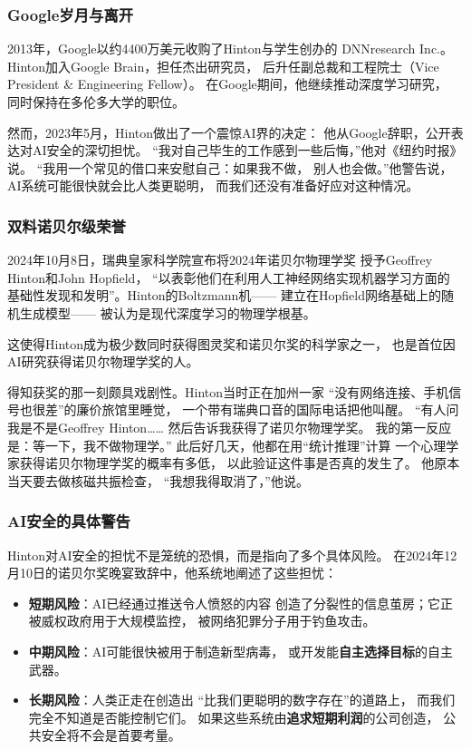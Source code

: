 \subsubsection{Google岁月与离开}
2013年，Google以约4400万美元收购了Hinton与学生创办的
DNNresearch Inc.。Hinton加入Google Brain，担任杰出研究员，
后升任副总裁和工程院士（Vice President \& Engineering Fellow）。
在Google期间，他继续推动深度学习研究，
同时保持在多伦多大学的职位。

然而，2023年5月，Hinton做出了一个震惊AI界的决定：
他从Google辞职，公开表达对AI安全的深切担忧。
``我对自己毕生的工作感到一些后悔，''他对《纽约时报》说。
``我用一个常见的借口来安慰自己：如果我不做，
别人也会做。''他警告说，AI系统可能很快就会比人类更聪明，
而我们还没有准备好应对这种情况。

\subsubsection{双料诺贝尔级荣誉}
2024年10月8日，瑞典皇家科学院宣布将2024年诺贝尔物理学奖
授予Geoffrey Hinton和John Hopfield，
``以表彰他们在利用人工神经网络实现机器学习方面的
基础性发现和发明''。Hinton的Boltzmann机——
建立在Hopfield网络基础上的随机生成模型——
被认为是现代深度学习的物理学根基。

这使得Hinton成为极少数同时获得图灵奖和诺贝尔奖的科学家之一，
也是首位因AI研究获得诺贝尔物理学奖的人。

得知获奖的那一刻颇具戏剧性。Hinton当时正在加州一家
``没有网络连接、手机信号也很差''的廉价旅馆里睡觉，
一个带有瑞典口音的国际电话把他叫醒。
``有人问我是不是Geoffrey Hinton……
然后告诉我获得了诺贝尔物理学奖。
我的第一反应是：等一下，我不做物理学。''
此后好几天，他都在用``统计推理''计算
一个心理学家获得诺贝尔物理学奖的概率有多低，
以此验证这件事是否真的发生了。
他原本当天要去做核磁共振检查，
``我想我得取消了，''他说。

\subsubsection{AI安全的具体警告}
Hinton对AI安全的担忧不是笼统的恐惧，而是指向了多个具体风险。
在2024年12月10日的诺贝尔奖晚宴致辞中，他系统地阐述了这些担忧：

\begin{itemize}[noitemsep]
  \item \textbf{短期风险}：AI已经通过推送令人愤怒的内容
    创造了分裂性的信息茧房；它正被威权政府用于大规模监控，
    被网络犯罪分子用于钓鱼攻击。
  \item \textbf{中期风险}：AI可能很快被用于制造新型病毒，
    或开发能\textbf{自主选择目标}的自主武器。
  \item \textbf{长期风险}：人类正走在创造出
    ``比我们更聪明的数字存在''的道路上，
    而我们完全不知道是否能控制它们。
    如果这些系统由\textbf{追求短期利润}的公司创造，
    公共安全将不会是首要考量。
\end{itemize}

